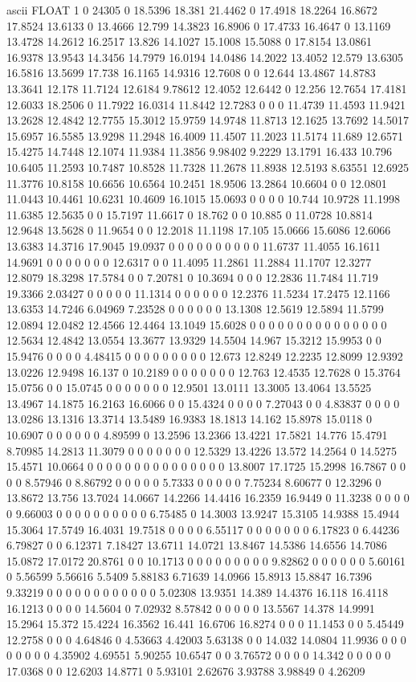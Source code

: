 ascii
FLOAT
1
0 24305 
0 18.5396 18.381 21.4462 0 17.4918 18.2264 16.8672 17.8524 13.6133 0 13.4666 12.799 14.3823 16.8906 0 17.4733 16.4647 0 13.1169 13.4728 14.2612 16.2517 13.826 14.1027 15.1008 15.5088 0 17.8154 13.0861 16.9378 13.9543 14.3456 14.7979 16.0194 14.0486 14.2022 13.4052 12.579 13.6305 16.5816 13.5699 17.738 16.1165 14.9316 12.7608 0 0 12.644 13.4867 14.8783 13.3641 12.178 11.7124 12.6184 9.78612 12.4052 12.6442 0 12.256 12.7654 17.4181 12.6033 18.2506 0 11.7922 16.0314 11.8442 12.7283 0 0 0 11.4739 11.4593 11.9421 13.2628 12.4842 12.7755 15.3012 15.9759 14.9748 11.8713 12.1625 13.7692 14.5017 15.6957 16.5585 13.9298 11.2948 16.4009 11.4507 11.2023 11.5174 11.689 12.6571 15.4275 14.7448 12.1074 11.9384 11.3856 9.98402 9.2229 13.1791 16.433 10.796 10.6405 11.2593 10.7487 10.8528 11.7328 11.2678 11.8938 12.5193 8.63551 12.6925 11.3776 10.8158 10.6656 10.6564 10.2451 18.9506 13.2864 10.6604 0 0 12.0801 11.0443 10.4461 10.6231 10.4609 16.1015 15.0693 0 0 0 0 10.744 10.9728 11.1998 11.6385 12.5635 0 0 15.7197 11.6617 0 18.762 0 0 10.885 0 11.0728 10.8814 12.9648 13.5628 0 11.9654 0 0 12.2018 11.1198 17.105 15.0666 15.6086 12.6066 13.6383 14.3716 17.9045 19.0937 0 0 0 0 0 0 0 0 0 0 11.6737 11.4055 16.1611 14.9691 0 0 0 0 0 0 0 12.6317 0 0 11.4095 11.2861 11.2884 11.1707 12.3277 12.8079 18.3298 17.5784 0 0 7.20781 0 10.3694 0 0 0 12.2836 11.7484 11.719 19.3366 2.03427 0 0 0 0 0 11.1314 0 0 0 0 0 0 12.2376 11.5234 17.2475 12.1166 13.6353 14.7246 6.04969 7.23528 0 0 0 0 0 0 13.1308 12.5619 12.5894 11.5799 12.0894 12.0482 12.4566 12.4464 13.1049 15.6028 0 0 0 0 0 0 0 0 0 0 0 0 0 0 0 12.5634 12.4842 13.0554 13.3677 13.9329 14.5504 14.967 15.3212 15.9953 0 0 15.9476 0 0 0 0 4.48415 0 0 0 0 0 0 0 0 0 12.673 12.8249 12.2235 12.8099 12.9392 13.0226 12.9498 16.137 0 10.2189 0 0 0 0 0 0 0 12.763 12.4535 12.7628 0 15.3764 15.0756 0 0 15.0745 0 0 0 0 0 0 0 12.9501 13.0111 13.3005 13.4064 13.5525 13.4967 14.1875 16.2163 16.6066 0 0 15.4324 0 0 0 0 7.27043 0 0 4.83837 0 0 0 0 13.0286 13.1316 13.3714 13.5489 16.9383 18.1813 14.162 15.8978 15.0118 0 10.6907 0 0 0 0 0 0 4.89599 0 13.2596 13.2366 13.4221 17.5821 14.776 15.4791 8.70985 14.2813 11.3079 0 0 0 0 0 0 0 12.5329 13.4226 13.572 14.2564 0 14.5275 15.4571 10.0664 0 0 0 0 0 0 0 0 0 0 0 0 0 0 0 13.8007 17.1725 15.2998 16.7867 0 0 0 0 8.57946 0 8.86792 0 0 0 0 0 5.7333 0 0 0 0 0 7.75234 8.60677 0 12.3296 0 13.8672 13.756 13.7024 14.0667 14.2266 14.4416 16.2359 16.9449 0 11.3238 0 0 0 0 0 9.66003 0 0 0 0 0 0 0 0 0 0 6.75485 0 14.3003 13.9247 15.3105 14.9388 15.4944 15.3064 17.5749 16.4031 19.7518 0 0 0 0 6.55117 0 0 0 0 0 0 0 6.17823 0 6.44236 6.79827 0 0 6.12371 7.18427 13.6711 14.0721 13.8467 14.5386 14.6556 14.7086 15.0872 17.0172 20.8761 0 0 10.1713 0 0 0 0 0 0 0 0 0 9.82862 0 0 0 0 0 0 5.60161 0 5.56599 5.56616 5.5409 5.88183 6.71639 14.0966 15.8913 15.8847 16.7396 9.33219 0 0 0 0 0 0 0 0 0 0 0 0 5.02308 13.9351 14.389 14.4376 16.118 16.4118 16.1213 0 0 0 0 14.5604 0 7.02932 8.57842 0 0 0 0 0 13.5567 14.378 14.9991 15.2964 15.372 15.4224 16.3562 16.441 16.6706 16.8274 0 0 0 11.1453 0 0 5.45449 12.2758 0 0 0 4.64846 0 4.53663 4.42003 5.63138 0 0 14.032 14.0804 11.9936 0 0 0 0 0 0 0 0 4.35902 4.69551 5.90255 10.6547 0 0 3.76572 0 0 0 0 14.342 0 0 0 0 0 17.0368 0 0 12.6203 14.8771 0 5.93101 2.62676 3.93788 3.98849 0 4.26209 